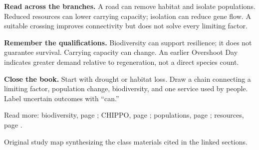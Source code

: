 \documentclass[11pt,letterpaper]{article}
\begin{document}
\par
\textbf{Read across the branches.} A road can remove habitat and isolate populations. Reduced resources can lower carrying capacity; isolation can reduce gene flow. A suitable crossing improves connectivity but does not solve every limiting factor.
\par
\textbf{Remember the qualifications.} Biodiversity can support resilience; it does not guarantee survival. Carrying capacity can change. An earlier Overshoot Day indicates greater demand relative to regeneration, not a direct species count.
\par
\textbf{Close the book.} Start with drought or habitat loss. Draw a chain connecting a limiting factor, population change, biodiversity, and one service used by people. Label uncertain outcomes with ``can.''
\par
{\small Read more: biodiversity, page \pageref{twoa}; CHIPPO, page \pageref{twob}; populations, page \pageref{twoc}; resources, page \pageref{resources}.\par}
{\footnotesize Original study map synthesizing the class materials cited in the linked sections.\par}
\end{document}
